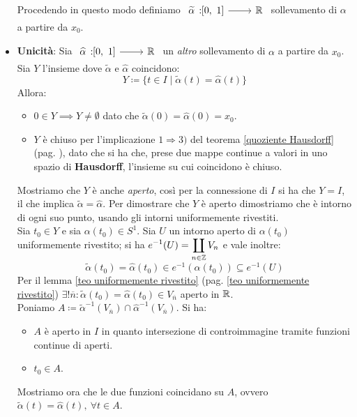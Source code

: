 \begin{demonstration}
\begin{itemize}
\begin{enumerate}
		\end{enumerate} 
	Procedendo in questo modo definiamo $\funz {\widetilde{\alpha}} \intv \realset$ sollevamento di $\alpha$ a partire da $x_0$.
	\item \textbf{Unicità}: Sia $\funz {\widehat{\alpha}} \intv \realset$ un \textit{altro} sollevamento di $\alpha$ a partire da $x_0$. Sia $Y$ l'insieme dove $\widetilde{\alpha}$ e $\widehat{\alpha}$ coincidono:
	\begin{equation*}
		Y \coloneqq \{t\in I \mid \widetilde{\alpha}(t)=\widehat{\alpha}(t)\}
	\end{equation*}
	Allora:
	\begin{itemize}
		\item $0\in Y \implies Y\neq\emptyset$ dato che $\widetilde{\alpha}(0)=\widehat{\alpha}(0)=x_0$.
		\item $Y$ è chiuso per l'implicazione $1\Rightarrow 3)$ del teorema \ref{quoziente Hausdorff} (pag. \pageref{quoziente Hausdorff}), dato che si ha che, prese due mappe continue a valori in uno spazio di \textbf{Hausdorff}, l'insieme su cui coincidono è chiuso.
	\end{itemize}
	Mostriamo che $Y$ è anche \textit{aperto}, così per la connessione di $I$ si ha che $Y=I$, il che implica $\widetilde{\alpha}=\widehat{\alpha}$. Per dimostrare che $Y$ è aperto dimostriamo che è intorno di ogni suo punto, usando gli intorni uniformemente rivestiti.\\
	Sia $t_0\in Y$ e sia $\alpha(t_0)\in S^1$. Sia $U$ un intorno aperto di $\alpha(t_0)$ uniformemente rivestito; si ha $\displaystyle e^{-1}(U)=\coprod_{n\in\mathbb{Z}}V_n$ e vale inoltre:
	\begin{equation*}
		\widetilde{\alpha}(t_0)=\widehat{\alpha}(t_0)\in e^{-1} \left( \alpha(t_0) \right)\subseteq e^{-1}(U)
	\end{equation*}
	Per il lemma \ref{teo uniformemente rivestito} (pag. \ref{teo uniformemente rivestito}) $\exists ! \overline{n} \colon \widetilde{\alpha} (t_0)=\widehat{\alpha}(t_0)\in V_{\overline{n}}$ aperto in $\mathbb{R}$. \\
	Poniamo $A\coloneqq \widetilde{\alpha}^{-1}(V_{\overline{n}}) \cap \widehat{\alpha}^{-1}(V_{\overline{n}})$. Si ha:
	\begin{itemize}
		\item $A$ è aperto in $I$ in quanto intersezione di controimmagine tramite funzioni continue di aperti.
		\item $t_0 \in A$.
	\end{itemize}
	Mostriamo ora che le due funzioni coincidano su $A$, ovvero $\widetilde{\alpha}(t)=\widehat{\alpha}(t),\ \forall t\in A$.\\

\end{itemize}
\end{demonstration}
